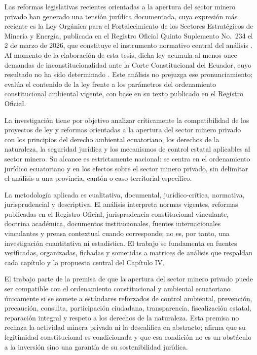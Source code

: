 Las reformas legislativas recientes orientadas a la apertura del sector minero privado han generado una tensión jurídica documentada, cuya expresión más reciente es la Ley Orgánica para el Fortalecimiento de los Sectores Estratégicos de Minería y Energía, publicada en el Registro Oficial Quinto Suplemento No.~234 el 2 de marzo de 2026, que constituye el instrumento normativo central del análisis \parencite{ley_fortalecimiento_2026}. Al momento de la elaboración de esta tesis, dicha ley acumula al menos once demandas de inconstitucionalidad ante la Corte Constitucional del Ecuador, cuyo resultado no ha sido determinado \parencite{primicias_demandas_2026}. Este análisis no prejuzga ese pronunciamiento; evalúa el contenido de la ley frente a los parámetros del ordenamiento constitucional ambiental vigente, con base en su texto publicado en el Registro Oficial.

La investigación tiene por objetivo analizar críticamente la compatibilidad de los proyectos de ley y reformas orientadas a la apertura del sector minero privado con los principios del derecho ambiental ecuatoriano, los derechos de la naturaleza, la seguridad jurídica y los mecanismos de control estatal aplicables al sector minero. Su alcance es estrictamente nacional: se centra en el ordenamiento jurídico ecuatoriano y en los efectos sobre el sector minero privado, sin delimitar el análisis a una provincia, cantón o caso territorial específico.

La metodología aplicada es cualitativa, documental, jurídico-crítica, normativa, jurisprudencial y descriptiva. El análisis interpreta normas vigentes, reformas publicadas en el Registro Oficial, jurisprudencia constitucional vinculante, doctrina académica, documentos institucionales, fuentes internacionales vinculantes y prensa contextual cuando corresponde; no es, por tanto, una investigación cuantitativa ni estadística. El trabajo se fundamenta en fuentes verificadas, organizadas, fichadas y sometidas a matrices de análisis que respaldan cada capítulo y la propuesta central del Capítulo IV.

El trabajo parte de la premisa de que la apertura del sector minero privado puede ser compatible con el ordenamiento constitucional y ambiental ecuatoriano únicamente si se somete a estándares reforzados de control ambiental, prevención, precaución, consulta, participación ciudadana, transparencia, fiscalización estatal, reparación integral y respeto a los derechos de la naturaleza. Esta premisa no rechaza la actividad minera privada ni la descalifica en abstracto; afirma que su legitimidad constitucional es condicionada y que esa condición no es un obstáculo a la inversión sino una garantía de su sostenibilidad jurídica.

